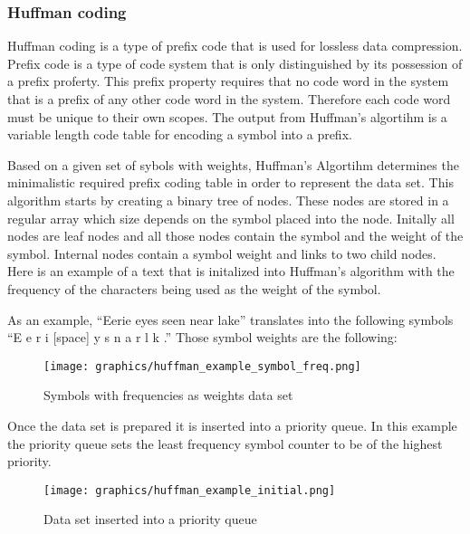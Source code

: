 \documentclass[letterpaper, 12pt]{article}
\begin{document}
\subsubsection{Huffman coding}
Huffman coding is a type of prefix code that is used for lossless data compression. Prefix code is a type
of code system that is only distinguished by its possession of a prefix proferty. This prefix property requires
that no code word in the system that is a prefix of any other code word in the system. Therefore each code word
must be unique to their own scopes. The output from Huffman's algortihm is a variable length code table for encoding
a symbol into a prefix.
\par\vspace{\baselineskip}
Based on a given set of sybols with weights, Huffman's Algortihm determines the minimalistic required prefix coding
table in order to represent the data set. This algorithm starts by creating a binary tree of nodes. These nodes
are stored in a regular array which size depends on the symbol placed into the node. Initally all nodes are leaf
nodes and all those nodes contain the symbol and the weight of the symbol. Internal nodes contain a symbol weight
and links to two child nodes. Here is an example of a text that is initalized into Huffman's algorithm with the
frequency of the characters being used as the weight of the symbol.
\par\vspace{\baselineskip}
As an example, ``Eerie eyes seen near lake'' translates into the following symbols ``E e r i [space] y s n a r l k .''
Those symbol weights are the following:
\par\vspace{\baselineskip}

\begin{figure}
  \centering
  \texttt{[image: graphics/huffman\_example\_symbol\_freq.png]}
  \caption{Symbols with frequencies as weights data set}
\end{figure}

Once the data set is prepared it is inserted into a priority queue. In this example the priority 
queue sets the least frequency symbol counter to be of the highest priority.
\par\vspace{\baselineskip}

\begin{figure}
  \centering
  \texttt{[image: graphics/huffman\_example\_initial.png]}
  \caption{Data set inserted into a priority queue}
\end{figure}
\end{document}
